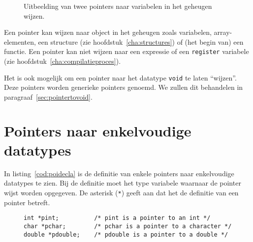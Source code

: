 \vspace*{-0.5\baselineskip}
\begin{figure}[!ht]
\centering
{}
\caption{Uitbeelding van twee pointers naar variabelen in het geheugen wijzen.}
\label{fig:poiinmem}
\end{figure}


Een pointer kan wijzen naar object in het geheugen zoals variabelen, array-elementen, een structure (zie hoofdstuk~\ref{cha:structures}) of (het begin van) een functie. Een pointer kan niet wijzen naar een expressie of een \texttt{register} variabele (zie hoofdstuk~\ref{cha:compilatieproces}).

Het is ook mogelijk om een pointer naar het datatype \texttt{void} te laten ``wijzen''. Deze pointers worden generieke pointers genoemd. We zullen dit behandelen in paragraaf~\ref{sec:pointertovoid}.

\section{Pointers naar enkelvoudige datatypes}
\label{sec:pointersnaarenkelvoudigedatatypes}
In listing~\ref{cod:poidecla} is de definitie van enkele pointers naar enkelvoudige datatypes te zien. Bij de definitie moet het type variabele waarnaar de pointer wijst worden opgegeven. De asterisk (\texttt{*}) geeft aan dat het de definitie van een pointer betreft.

\begin{figure}[!ht]
\begin{lstlisting}[caption=Enkele definities van pointers.,label=cod:poidecla]
int *pint;          /* pint is a pointer to an int */
char *pchar;        /* pchar is a pointer to a character */
double *pdouble;    /* pdouble is a pointer to a double */
\end{lstlisting}
\end{figure}

